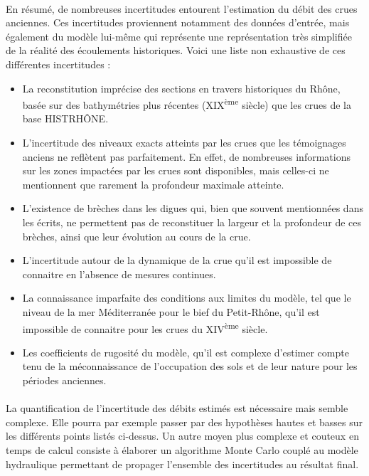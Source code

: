\documentclass[11pt]{article}
\begin{document}
	\paragraph{} En résumé, de nombreuses incertitudes entourent l'estimation du débit des crues anciennes. Ces incertitudes proviennent notamment des données d'entrée, mais également du modèle lui-même qui représente une représentation très simplifiée de la réalité des écoulements historiques. Voici une liste non exhaustive de ces différentes incertitudes :
	
	\begin{itemize}
		\item La reconstitution imprécise des sections en travers historiques du Rhône, basée sur des bathymétries plus récentes (XIX\textsuperscript{ème} siècle) que les crues de la base HISTRHÔNE.
		\item L'incertitude des niveaux exacts atteints par les crues que les témoignages anciens ne reflètent pas parfaitement. En effet, de nombreuses informations sur les zones impactées par les crues sont disponibles, mais celles-ci ne mentionnent que rarement la profondeur maximale atteinte.
		\item  L'existence de brèches dans les digues qui, bien que souvent mentionnées dans les écrits, ne permettent pas de reconstituer la largeur et la profondeur de ces brèches, ainsi que leur évolution au cours de la crue.
		\item L'incertitude autour de la dynamique de la crue qu'il est impossible de connaitre en l'absence de mesures continues.
		\item La connaissance imparfaite des conditions aux limites du modèle, tel que le niveau de la mer Méditerranée pour le bief du Petit-Rhône, qu'il est impossible de connaitre pour les crues du XIV\textsuperscript{ème} siècle.
		\item Les coefficients de rugosité du modèle, qu'il est complexe d'estimer compte tenu de la méconnaissance de l'occupation des sols et de leur nature pour les périodes anciennes.	
	\end{itemize}
		
	\paragraph{} La quantification de l'incertitude des débits estimés est nécessaire mais semble complexe. Elle pourra par exemple passer par des hypothèses hautes et basses sur les différents points listés ci-dessus. Un autre moyen plus complexe et couteux en temps de calcul consiste à élaborer un algorithme Monte Carlo couplé au modèle hydraulique permettant de propager l'ensemble des incertitudes au résultat final.	
	
\end{document}
